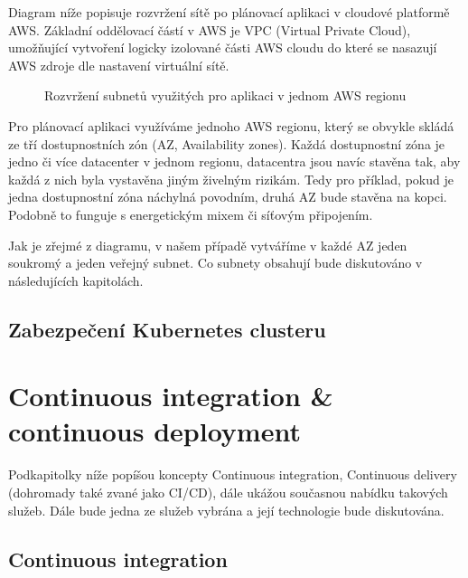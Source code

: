 \documentclass[thesis=M,czech]{FITthesis}[2019/12/23]
\theoremstyle{plain}
\theoremstyle{definition}
\begin{document}
Diagram níže popisuje rozvržení sítě po plánovací aplikaci v cloudové platformě AWS. Základní oddělovací částí v AWS je VPC (Virtual Private Cloud)\cite{aws-vpc}, umožňující vytvoření logicky izolované části AWS cloudu do které se nasazují AWS zdroje dle nastavení virtuální sítě.

\begin{figure}[H]\centering
	

	\caption[Rozvržení subnetů využitých pro aplikaci v jednom AWS regionu]{Rozvržení subnetů využitých pro aplikaci v jednom AWS regionu}\label{fig:float}
\end{figure}

Pro plánovací aplikaci využíváme jednoho AWS regionu, který se obvykle skládá ze tří dostupnostních zón (AZ, Availability zones)\cite{aws-azs}. Každá dostupnostní zóna je jedno či více datacenter v jednom regionu, datacentra jsou navíc stavěna tak, aby každá z nich byla vystavěna jiným živelným rizikám. Tedy pro příklad, pokud je jedna dostupnostní zóna náchylná povodním, druhá AZ bude stavěna na kopci. Podobně to funguje s energetickým mixem či síťovým připojením. 


Jak je zřejmé z diagramu, v našem případě vytváříme v každé AZ jeden soukromý a jeden veřejný subnet. Co subnety obsahují bude diskutováno v následujících kapitolách.

\subsection{Zabezpečení Kubernetes clusteru}



\section{Continuous integration \& continuous deployment}

Podkapitolky níže popíšou koncepty Continuous integration, Continuous delivery (dohromady také zvané jako CI/CD), dále ukážou současnou nabídku takových služeb. Dále bude jedna ze služeb vybrána a její technologie bude diskutována.

\subsection{Continuous integration}
\end{document}

